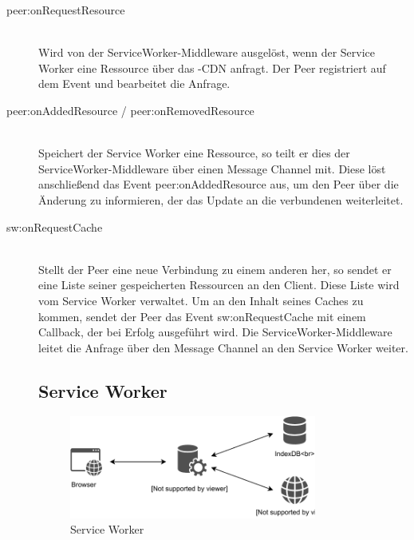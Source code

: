 \begin{description}
	\item[peer:onRequestResource]\hfill \\
	Wird von der ServiceWorker-Middleware ausgelöst, wenn der Service Worker eine Ressource über das \pTp-CDN anfragt. Der Peer registriert auf dem Event und bearbeitet die Anfrage.
	\item[peer:onAddedResource / peer:onRemovedResource]\hfill \\
	Speichert der Service Worker eine Ressource, so teilt er dies der ServiceWorker-Middleware über einen Message Channel mit. Diese löst anschließend das Event peer:onAddedResource aus, um den Peer über die Änderung zu informieren, der das Update an die verbundenen \clients weiterleitet.
	\item[sw:onRequestCache]\hfill \\
	Stellt der Peer eine neue Verbindung zu einem anderen \client her, so sendet er eine Liste seiner gespeicherten Ressourcen an den Client. Diese Liste wird vom Service Worker verwaltet. Um an den Inhalt seines Caches zu kommen, sendet der Peer das Event sw:onRequestCache mit einem Callback, der bei Erfolg ausgeführt wird. Die ServiceWorker-Middleware leitet die Anfrage über den Message Channel an den Service Worker weiter.
%	
%

\subsection{Service Worker}

\begin{figure}[!h]
	\centering
	\includegraphics[width=0.8\textwidth]{figures/ServiceWorker}
	\caption[A Figure Short-Title]{Service Worker}
	\label{fig:serviceWorker}
\end{figure}


\end{description}
